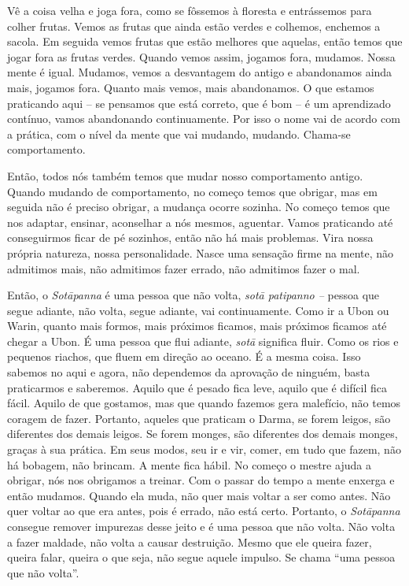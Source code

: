 Vê a coisa velha e joga fora, como se fôssemos à floresta e
entrássemos para colher frutas. Vemos as frutas que ainda estão verdes
e colhemos, enchemos a sacola. Em seguida vemos frutas que estão
melhores que aquelas, então temos que jogar fora as frutas verdes.
Quando vemos assim, jogamos fora, mudamos. Nossa mente é igual.
Mudamos, vemos a desvantagem do antigo e abandonamos ainda mais,
jogamos fora. Quanto mais vemos, mais abandonamos. O que estamos
praticando aqui – se pensamos que está correto, que é bom – é um
aprendizado contínuo, vamos abandonando continuamente. Por isso o nome
vai de acordo com a prática, com o nível da mente que vai mudando,
mudando. Chama-se comportamento. 

Então, todos nós também temos que mudar nosso comportamento antigo.
Quando mudando de comportamento, no começo temos que obrigar, mas em
seguida não é preciso obrigar, a mudança ocorre sozinha. No começo
temos que nos adaptar, ensinar, aconselhar a nós mesmos, aguentar.
Vamos praticando até conseguirmos ficar de pé sozinhos, então não há
mais problemas. Vira nossa própria natureza, nossa personalidade. Nasce
uma sensação firme na mente, não admitimos mais, não admitimos fazer
errado, não admitimos fazer o mal. 

Então, o \textit{Sot\=apanna }é uma pessoa que não volta,
\textit{sot\=a patipanno – }pessoa que segue adiante, não volta, segue
adiante, vai continuamente. Como ir a Ubon ou Warin, quanto mais
formos, mais próximos ficamos, mais próximos ficamos até chegar a Ubon.
É uma pessoa que flui adiante, \textit{sot\=a }significa fluir. Como os
rios e pequenos riachos, que fluem em direção ao oceano. É a mesma
coisa. Isso sabemos no aqui e agora, não dependemos da aprovação de
ninguém, basta praticarmos e saberemos. Aquilo que é pesado fica leve,
aquilo que é difícil fica fácil. Aquilo de que gostamos, mas que quando
fazemos gera malefício, não temos coragem de fazer. Portanto, aqueles
que praticam o Darma, se forem leigos, são diferentes dos demais
leigos. Se forem monges, são diferentes dos demais monges, graças à sua
prática. Em seus modos, seu ir e vir, comer, em tudo que fazem, não há
bobagem, não brincam. A mente fica hábil. No começo o mestre ajuda a
obrigar, nós nos obrigamos a treinar. Com o passar do tempo a mente
enxerga e então mudamos. Quando ela muda, não quer mais voltar a ser
como antes. Não quer voltar ao que era antes, pois é errado, não está
certo. Portanto, o \textit{Sot\=apanna} consegue remover impurezas
desse jeito e é uma pessoa que não volta. Não volta a fazer maldade,
não volta a causar destruição. Mesmo que ele queira fazer, queira
falar, queira o que seja, não segue aquele impulso. Se chama “uma
pessoa que não volta”. 

